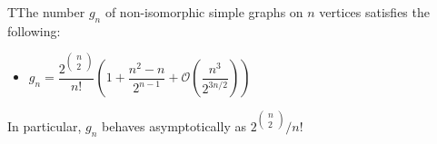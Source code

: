 \begin{theo}
  TThe number $g_n$ of non-isomorphic simple graphs on $n$ vertices satisfies the following:\par
  \begin{itemize}
    \item $g_n = \dfrac{2^{\begin{pmatrix}n\\2\end{pmatrix}}}{n!}\left(1+\dfrac{n^2-n}{2^{n-1}}+\mathcal{O}\left(\dfrac{n^3}{2^{3n/2}}\right)\right)$
  \end{itemize}
  \par\bigskip
  \noindent In particular, $g_n$ behaves asymptotically as $2^{\begin{pmatrix}n\\2\end{pmatrix}}/n!$
\end{theo}
\par\bigskip
